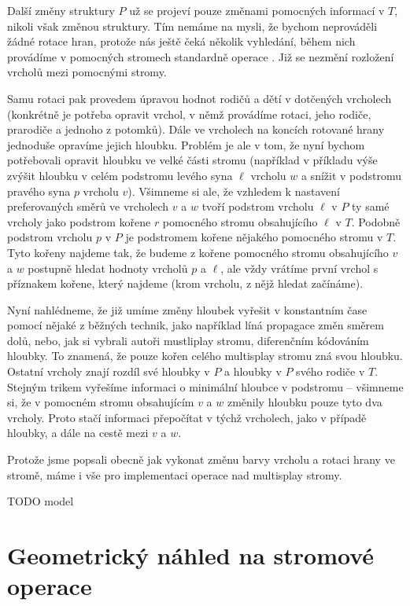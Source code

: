 Další změny struktury $P$ už se projeví pouze změnami pomocných informací v
$T$, nikoli však změnou struktury. Tím nemáme na mysli, že bychom neprováděli
žádné rotace hran, protože nás ještě čeká několik vyhledání, během nich
provádíme v pomocných stromech standardně operace . Již se nezmění
rozložení vrcholů mezi pomocnými stromy.

Samu rotaci pak provedem úpravou hodnot rodičů a dětí v dotčených vrcholech
(konkrétně je potřeba opravit vrchol, v němž provádíme rotaci, jeho rodiče,
prarodiče a jednoho z potomků). Dále ve vrcholech na koncích rotované hrany
jednoduše opravíme jejich hloubku. Problém je ale v tom, že nyní bychom
potřebovali opravit hloubku ve velké části stromu (například v příkladu výše
zvýšit hloubku v celém podstromu levého syna $\ell$ vrcholu $w$ a snížit v
podstromu pravého syna $p$ vrcholu $v$). Všimneme si ale, že vzhledem k
nastavení preferovaných směrů ve vrcholech $v$ a $w$ tvoří podstrom vrcholu
$\ell$ v $P$ ty samé vrcholy jako podstrom kořene $r$ pomocného stromu
obsahujícího $\ell$ v $T$. Podobně podstrom vrcholu $p$ v $P$ je podstromem
kořene nějakého pomocného stromu v $T$. Tyto kořeny najdeme tak, že budeme z
kořene pomocného stromu obsahujícího $v$ a $w$ postupně hledat hodnoty
vrcholů $p$ a $\ell$, ale vždy vrátíme první vrchol s příznakem kořene, který
najdeme (krom vrcholu, z nějž hledat začínáme).

Nyní nahlédneme, že již umíme změny hloubek vyřešit v konstantním čase pomocí nějaké
z běžných technik, jako například líná propagace změn směrem dolů, nebo, jak si
vybrali autoři mustliplay stromu, diferenčním kódováním hloubky. To znamená, že
pouze kořen celého multisplay stromu zná svou hloubku. Ostatní vrcholy znají
rozdíl své hloubky v $P$ a hloubky v $P$ svého rodiče v $T$. Stejným trikem
vyřešíme informaci o minimální hloubce v podstromu -- všimneme si, že v
pomocném stromu obsahujícím $v$ a $w$ změnily hloubku pouze tyto dva vrcholy.
Proto stačí informaci přepočítat v týchž vrcholech, jako v případě hloubky, a
dále na cestě mezi $v$ a $w$.

Protože jsme popsali obecně jak vykonat změnu barvy vrcholu a rotaci hrany ve stromě, máme i vše pro implementaci operace  nad multisplay stromy.

TODO model
\section{Geometrický náhled na stromové operace}
